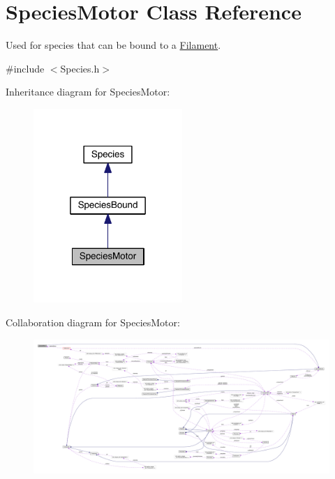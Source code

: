 \hypertarget{classSpeciesMotor}{\section{Species\+Motor Class Reference}
\label{classSpeciesMotor}
}


Used for species that can be bound to a \hyperlink{classFilament}{Filament}.  




{\ttfamily \#include $<$Species.\+h$>$}



Inheritance diagram for Species\+Motor\+:\nopagebreak
\begin{figure}[H]
\begin{center}
\leavevmode
\includegraphics[width=160pt]{classSpeciesMotor__inherit__graph}
\end{center}
\end{figure}


Collaboration diagram for Species\+Motor\+:
\nopagebreak
\begin{figure}[H]
\begin{center}
\leavevmode
\includegraphics[width=350pt]{classSpeciesMotor__coll__graph}
\end{center}
\end{figure}

